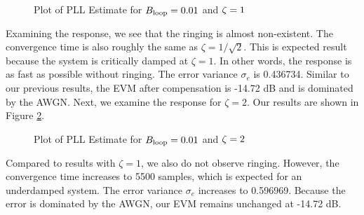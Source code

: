 \documentclass{article}
\begin{document}
\begin{figure}[H]
	\centerline{}
	\caption{Plot of PLL Estimate for $\protect{B_\text{loop}} = 0.01$ and $\protect{\zeta = 1}$}
	\label{fig::convergence_Bloop_0p01_damp_1}
\end{figure}

\noindent Examining the response, we see that the ringing is almost non-existent. The convergence time is also roughly the same as $\zeta = 1/\sqrt{2}$. This is expected result because the system is critically damped at $\zeta = 1$. In other words, the response is as fast as possible without ringing. The error variance $\sigma_e$ is 0.436734. Similar to our previous results, the EVM after compensation is -14.72 dB and is dominated by the AWGN. Next, we examine the response for $\zeta = 2$. Our results are shown in Figure \ref{fig::convergence_Bloop_0p01_damp_2}.

\begin{figure}[H]
	\centerline{}
	\caption{Plot of PLL Estimate for $\protect{B_\text{loop}} = 0.01$ and $\protect{\zeta = 2}$}
	\label{fig::convergence_Bloop_0p01_damp_2}
\end{figure}

\noindent Compared to results with $\zeta = 1$, we also do not observe ringing. However, the convergence time increases to 5500 samples, which is expected for an underdamped system. The error variance $\sigma_e$ increases to 0.596969. Because the error is dominated by the AWGN, our EVM remains unchanged at -14.72 dB.
\end{document}
